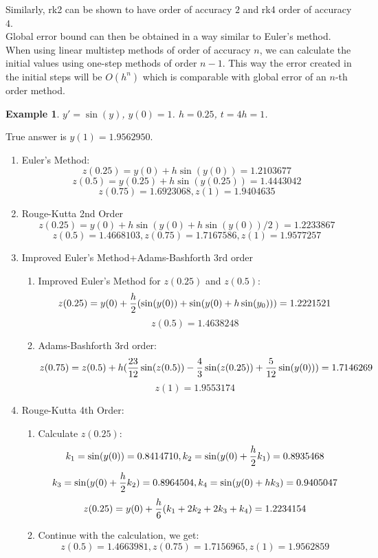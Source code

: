 \documentclass{article} %
\theoremstyle{break}
\newtheorem{exa}[definition]{Example}
\begin{document}
Similarly, rk2 can be shown to have order of accuracy $2$ and rk4 order of accuracy $4$.\\

Global error bound can then be obtained in a way similar to Euler's method.\\

When using linear multistep methods of order of accuracy $n$, we can calculate the initial values using one-step methods of order $n-1$. This way the error created in the initial steps will be $O(h^n)$ which is comparable with global error of an $n$-th order method.\\


\begin{exa}$y'=\sin(y)$, $y(0)=1$. $h=0.25$, $t=4h=1$.\end{exa}
True answer is $y(1)=1.9562950$.
\begin{enumerate}
\item Euler's Method:
  \[z(0.25)=y(0)+h\sin(y(0))=1.2103677\]
  \[z(0.5)=y(0.25)+h\sin(y(0.25))=1.4443042\]
  \[z(0.75)=1.6923068, z(1)=1.9404635\]
\item Rouge-Kutta 2nd Order
  \[z(0.25)=y(0)+h\sin(y(0)+h\sin(y(0))/2)=1.2233867\]
  \[z(0.5)=1.4668103, z(0.75)=1.7167586, z(1)=1.9577257\]

\item Improved Euler's Method+Adams-Bashforth 3rd order
  \begin{enumerate}
  \item Improved Euler's Method for $z(0.25)$ and $z(0.5)$:
    \[z(0.25)=y(0)+{h\over 2}(\sin(y(0))+\sin(y(0)+h\sin(y_0)))=1.2221521\]
    \[z(0.5)=1.4638248\]
  \item Adams-Bashforth 3rd order:
    \[z(0.75)=z(0.5)+h({23\over 12}\sin(z(0.5))-{4\over 3}\sin(z(0.25))+{5\over 12}\sin(y(0)))=1.7146269\]
    \[z(1)=1.9553174\]
  \end{enumerate}
  \item Rouge-Kutta 4th Order:
    \begin{enumerate}
    \item Calculate $z(0.25)$:
      \[k_1=\sin(y(0))=0.8414710, k_2=\sin(y(0)+{h\over 2}k_1)=0.8935468\]
      \[k_3=\sin(y(0)+{h\over 2}k_2)=0.8964504, k_4=\sin(y(0)+hk_3)=0.9405047\]
      \[z(0.25)=y(0)+{h\over 6}(k_1+2k_2+2k_3+k_4)=1.2234154\]
    \item Continue with the calculation, we get:
      \[z(0.5)=1.4663981, z(0.75)=1.7156965, z(1)=1.9562859\]
     \end{enumerate}
\end{enumerate}
\end{document}
